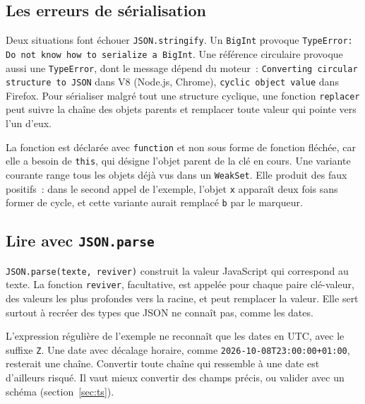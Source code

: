 \documentclass[12pt,a4paper]{article}
\newcommand{\exemple}[3][]{%
  \par\addvspace{6pt}\noindent\begin{minipage}{\linewidth}%
  \end{minipage}\par\addvspace{6pt}}
\begin{document}
\exemple[language=javascript]{js/02_tojson.mjs}{Méthode \texttt{toJSON} d'une classe et d'une date}

\subsection{Les erreurs de sérialisation}
Deux situations font échouer \texttt{JSON.stringify}. Un \texttt{BigInt} provoque \texttt{TypeError: Do not know how to serialize a BigInt}. Une référence circulaire provoque aussi une \texttt{TypeError}, dont le message dépend du moteur~: \texttt{Converting circular structure to JSON} dans V8 (Node.js, Chrome), \texttt{cyclic object value} dans Firefox. Pour sérialiser malgré tout une structure cyclique, une fonction \texttt{replacer} peut suivre la chaîne des objets parents et remplacer toute valeur qui pointe vers l'un d'eux.

\exemple[language=javascript]{js/03_cycles.mjs}{Remplacer les références circulaires}

La fonction est déclarée avec \texttt{function} et non sous forme de fonction fléchée, car elle a besoin de \texttt{this}, qui désigne l'objet parent de la clé en cours. Une variante courante range tous les objets déjà vus dans un \texttt{WeakSet}. Elle produit des faux positifs~: dans le second appel de l'exemple, l'objet \texttt{x} apparaît deux fois sans former de cycle, et cette variante aurait remplacé \texttt{b} par le marqueur.

\subsection{Lire avec \texttt{JSON.parse}}
\texttt{JSON.parse(texte, reviver)} construit la valeur JavaScript qui correspond au texte. La fonction \texttt{reviver}, facultative, est appelée pour chaque paire clé-valeur, des valeurs les plus profondes vers la racine, et peut remplacer la valeur. Elle sert surtout à recréer des types que JSON ne connaît pas, comme les dates.

\exemple[language=javascript]{js/04_reviver.mjs}{Recréer des objets \texttt{Date} avec un \texttt{reviver}}

L'expression régulière de l'exemple ne reconnaît que les dates en UTC, avec le suffixe \texttt{Z}. Une date avec décalage horaire, comme \texttt{2026-10-08T23:00:00+01:00}, resterait une chaîne. Convertir toute chaîne qui ressemble à une date est d'ailleurs risqué. Il vaut mieux convertir des champs précis, ou valider avec un schéma (section~\ref{sec:ts}).
\end{document}
